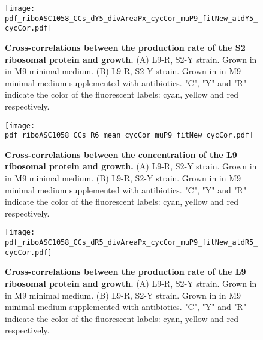 \begin{figure}
    \centering
    \texttt{[image: pdf\_riboASC1058\_CCs\_dY5\_divAreaPx\_cycCor\_muP9\_fitNew\_atdY5\_cycCor.pdf]}
    \caption{ 
        \textbf{Cross-correlations between the production rate of the S2 ribosomal protein and growth.}
        (A) L9-R, S2-Y strain. Grown in in M9 minimal medium.
        (B) L9-R, S2-Y strain. Grown in in M9 minimal medium supplemented with antibiotics. 
        "C", "Y" and "R" indicate the color of the fluorescent labels: cyan, yellow and red respectively.
%
    }
    \label{fig:ribo:CCsPmuS2}
\end{figure}





\begin{figure}
    \centering
    \texttt{[image: pdf\_riboASC1058\_CCs\_R6\_mean\_cycCor\_muP9\_fitNew\_cycCor.pdf]}
    \caption{ 
        \textbf{Cross-correlations between the concentration of the L9 ribosomal protein and growth.}
        (A) L9-R, S2-Y strain. Grown in in M9 minimal medium.
        (B) L9-R, S2-Y strain. Grown in in M9 minimal medium supplemented with antibiotics. 
        "C", "Y" and "R" indicate the color of the fluorescent labels: cyan, yellow and red respectively.
%
    }
    \label{fig:ribo:CCsEmuL9}
\end{figure}

\begin{figure}
    \centering
    \texttt{[image: pdf\_riboASC1058\_CCs\_dR5\_divAreaPx\_cycCor\_muP9\_fitNew\_atdR5\_cycCor.pdf]}
    \caption{ 
        \textbf{Cross-correlations between the production rate of the L9 ribosomal protein and growth.}
        (A) L9-R, S2-Y strain. Grown in in M9 minimal medium.
        (B) L9-R, S2-Y strain. Grown in in M9 minimal medium supplemented with antibiotics. 
        "C", "Y" and "R" indicate the color of the fluorescent labels: cyan, yellow and red respectively.
%
    }
    \label{fig:ribo:CCsPmuL9}
\end{figure}

